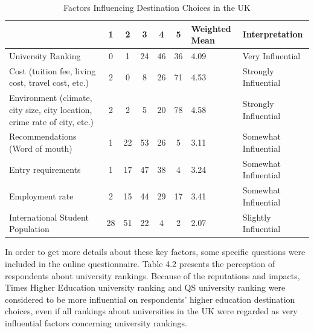 \begin{table}[H]
\centering
\caption{Factors Influencing Destination Choices in the UK
}
\label{my-label}
\begin{tabular}{|p{4cm}|c|c|c|c|c|p{2cm}|p{3cm}|}
\hline
                                                                          & \textbf{1} & \textbf{2} & \textbf{3} & \textbf{4} & \textbf{5} & \textbf{Weighted Mean} & \textbf{Interpretation} \\ \hline
University Ranking                                                        & 0          & 1          & 24         & 46         & 36         & 4.09                   & Very Influential        \\ \hline
Cost (tuition fee, living cost, travel cost, etc.)                        & 2          & 0          & 8          & 26         & 71         & 4.53                   & Strongly Influential    \\ \hline
Environment (climate, city size, city location, crime rate of city, etc.) & 2          & 2          & 5          & 20         & 78         & 4.58                   & Strongly Influential    \\ \hline
Recommendations (Word of mouth)                                           & 1          & 22         & 53         & 26         & 5          & 3.11                   & Somewhat Influential    \\ \hline
Entry requirements                                                        & 1          & 17         & 47         & 38         & 4          & 3.24                   & Somewhat Influential    \\ \hline
Employment rate                                                           & 2          & 15         & 44         & 29         & 17         & 3.41                   & Somewhat Influential    \\ \hline
International Student Population                                          & 28         & 51         & 22         & 4          & 2          & 2.07                   & Slightly Influential    \\ \hline
\end{tabular}
\end{table}

In order to get more details about these key factors, some specific questions were included in the online questionnaire. Table 4.2 presents the perception of respondents about university rankings. Because of the reputations and impacts, Times Higher Education university ranking and QS university ranking were considered to be more influential on respondents’ higher education destination choices, even if all rankings about universities in the UK were regarded as very influential factors concerning university rankings.


